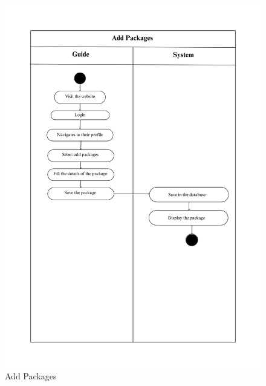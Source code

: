 \begin{figure}[h!]
    \centering
    \includegraphics[width=1\textwidth]{Images/Activity Diagrams/14 Add Packages.png}
    \caption{Add Packages}
    \label{fig:activity-add-packages}
\end{figure}

